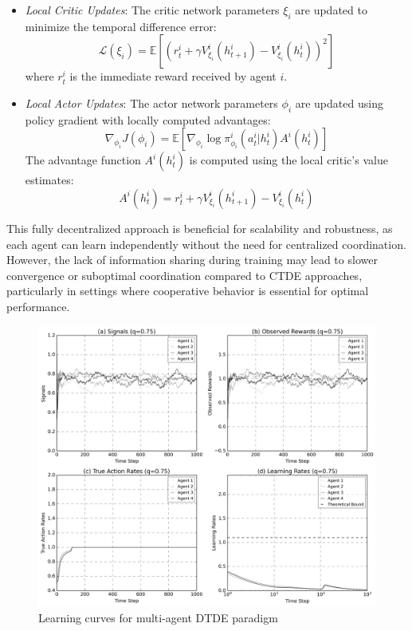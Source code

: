 \begin{itemize}
    \item \textit{Local Critic Updates}: The critic network parameters $\xi_i$ are updated to minimize the temporal difference error:
    \[
        \mathcal{L}(\xi_i) = \mathbb{E}\left[(r_t^i + \gamma V^i_{\xi_i}(h_{t+1}^i) - V^i_{\xi_i}(h_t^i))^2\right]
    \]
    where $r_t^i$ is the immediate reward received by agent $i$.
    
    \item \textit{Local Actor Updates}: The actor network parameters $\phi_i$ are updated using policy gradient with locally computed advantages:
    \[
        \nabla_{\phi_i} J(\phi_i) = \mathbb{E}\left[\nabla_{\phi_i} \log \pi^i_{\phi_i}(a^i_t|h^i_t) A^i(h^i_t)\right]
    \]
    The advantage function $A^i(h^i_t)$ is computed using the local critic's value estimates:
    \[
        A^i(h^i_t) = r_t^i + \gamma V^i_{\xi_i}(h_{t+1}^i) - V^i_{\xi_i}(h_t^i)
    \]
\end{itemize}

This fully decentralized approach is beneficial for scalability and robustness, as each agent can learn independently without the need for centralized coordination. However, the lack of information sharing during training may lead to slower convergence or suboptimal coordination compared to CTDE approaches, particularly in settings where cooperative behavior is essential for optimal performance.

\begin{figure}[htbp]
    \centering
    \includegraphics[width=1\textwidth]{../charts/multi_agent_dtde_learning_curves_q=0.75.png}
    \caption{Learning curves for multi-agent DTDE paradigm} 
    \label{fig:multi-learning-curves-dtde}
\end{figure}

